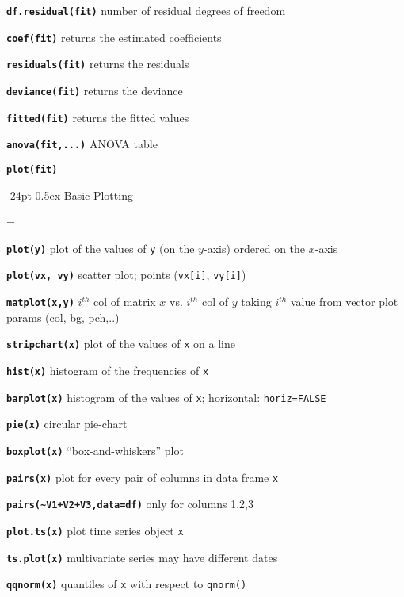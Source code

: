\documentclass[8pt,landscape]{article}
\makeatletter
\renewcommand\section{\@startsection{section}{1}{0mm}%
                                     {-24pt}%
                                     {0.5ex}%
                                {\color{blue}\normalfont\large\bfseries}}
\newcommand{\code}{\texttt}
\newcommand{\bcode}[1]{\texttt{\textbf{#1}}}
\makeatother
\begin{document}
\begin{multicols*}{3}
\bcode{df.residual(fit)}  number of residual degrees of freedom

\bcode{coef(fit)}  returns the estimated coefficients

\bcode{residuals(fit)}  returns the residuals

\bcode{deviance(fit)}  returns the deviance

\bcode{fitted(fit)}  returns the fitted values




\bcode{anova(fit,...)} ANOVA table

\bcode{plot(fit)} 



\vspace{-6ex}
\section{Basic Plotting}

\everypar={\hangindent=9mm}

\bcode{plot(y)}  plot of the values of \code{y} (on the $y$-axis) ordered on the $x$-axis

\bcode{plot(vx, vy)}  scatter plot; points (\code{vx[i]}, \code{vy[i]})

\bcode{matplot(x,y)}  $i^{th}$ col of matrix $x$ vs. $i^{th}$ col of $y$ taking $i^{th}$ value from vector plot params (col, bg, pch,..)

\bcode{stripchart(x)}  plot of the values of \code{x} on a line 

\bcode{hist(x)}  histogram of the frequencies of \code{x}

\bcode{barplot(x)}  histogram of the values of \code{x}; horizontal: \code{horiz=FALSE}

\bcode{pie(x)}  circular pie-chart

\bcode{boxplot(x)}  ``box-and-whiskers'' plot

\bcode{pairs(x)}  plot for every pair of columns in data frame  \code{x}

\bcode{pairs({\textasciitilde{}}V1+V2+V3,data=df)} only for columns 1,2,3

\bcode{plot.ts(x)}  plot time series object \code{x}

\bcode{ts.plot(x)}  multivariate series may have different dates

\bcode{qqnorm(x)}  quantiles of \code{x} with respect to \code{qnorm()}


\end{multicols*}
\end{document}
